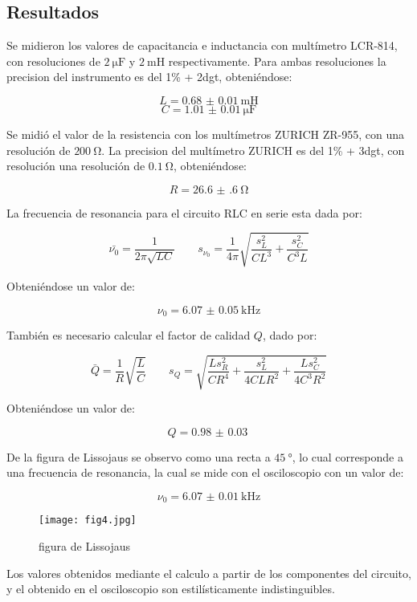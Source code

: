 \documentclass[12pt,a4paper]{article}
\begin{document}
\subsection*{Resultados}

Se midieron los valores de capacitancia e inductancia con multímetro LCR-814, con resoluciones de $\SI{2}{\micro\farad}$ y $\SI{2}{\milli\henry}$ respectivamente. Para ambas resoluciones la precision del instrumento es del 1\% + 2dgt, obteniéndose:

$$L = \SI{0.68(1)}{\milli\henry}$$
$$C = \SI{1.01(1)}{\micro \farad}$$

Se midió el valor de la resistencia con los multímetros ZURICH ZR-955, con una resolución de $\SI{200}{\ohm}$. La precision del multímetro ZURICH es del 1\% + 3dgt, con resolución una resolución de $ \SI{0.1}{\ohm}$, obteniéndose:

$$ R = \SI{26.6(6)}{\ohm} $$ 

La frecuencia de resonancia para el circuito RLC en serie esta dada por: 

$$\bar{\nu_0} = \frac{1}{2\pi \sqrt{L C}} \qquad s_{\nu_0} = \frac{1}{4 \pi}\sqrt{\frac{s_{L}^{2}}{ C L^{3}} + \frac{s_{C}^{2}}{ C^{3} L}}$$


Obteniéndose un valor de: 

$$ \nu_0 = \SI{6.07(5)}{\kilo\hertz} $$

También es necesario calcular el factor de calidad $Q$, dado por:

$$\bar{Q} = \frac{1}{R}\sqrt{\frac{L}{C}} \qquad s_Q = \sqrt{\frac{L s_{R}^{2}}{C R^{4}} + \frac{s_{L}^{2}}{4 C L R^{2}} + \frac{L s_{C}^{2}}{4 C^{3} R^{2}}}
$$

Obteniéndose un valor de: 

$$ Q = \SI{0.98(3)}{}$$


De la figura de Lissojaus se observo como una recta a $\SI{45}{\degree}$, lo cual corresponde a una frecuencia de resonancia, la cual se mide con el osciloscopio con un valor de:  

$$ \nu_0 = \SI{6.07(1)}{\kilo\hertz} $$ 

\begin{figure}[H]
  \centering
   \texttt{[image: fig4.jpg]}
\caption{figura de Lissojaus}
  \label{esquematico}
\end{figure}

Los valores obtenidos mediante el calculo a partir de los componentes del circuito, y el obtenido en el osciloscopio son estilísticamente indistinguibles.
\end{document}
